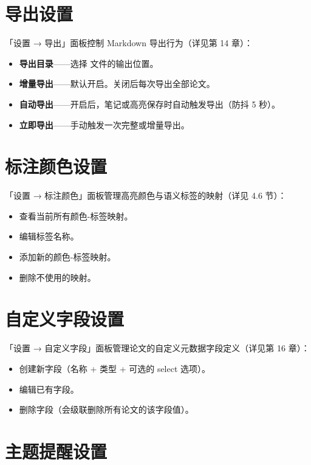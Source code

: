 \section{导出设置}

「设置 → 导出」面板控制 Markdown 导出行为（详见第 14 章）：

\begin{itemize}
  \item \textbf{导出目录}——选择  文件的输出位置。
  \item \textbf{增量导出}——默认开启。关闭后每次导出全部论文。
  \item \textbf{自动导出}——开启后，笔记或高亮保存时自动触发导出（防抖 5 秒）。
  \item \textbf{立即导出}——手动触发一次完整或增量导出。
\end{itemize}

\section{标注颜色设置}

「设置 → 标注颜色」面板管理高亮颜色与语义标签的映射（详见 4.6 节）：

\begin{itemize}
  \item 查看当前所有颜色-标签映射。
  \item 编辑标签名称。
  \item 添加新的颜色-标签映射。
  \item 删除不使用的映射。
\end{itemize}

\section{自定义字段设置}

「设置 → 自定义字段」面板管理论文的自定义元数据字段定义（详见第 16 章）：

\begin{itemize}
  \item 创建新字段（名称 + 类型 + 可选的 select 选项）。
  \item 编辑已有字段。
  \item 删除字段（会级联删除所有论文的该字段值）。
\end{itemize}

\section{主题提醒设置}

